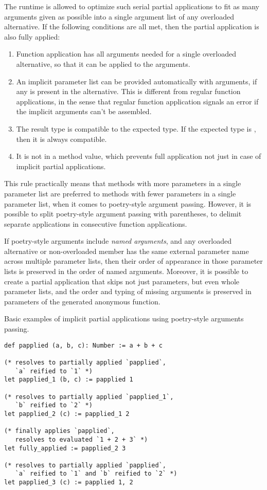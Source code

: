 The runtime is allowed to optimize such serial partial applications to fit as many arguments given as possible into a single argument list of any overloaded alternative. If the following conditions are all met, then the partial application is also fully applied:
\begin{enumerate}
  \item Function application has all arguments needed for a single overloaded alternative, so that it can be applied to the arguments. 
  \item An implicit parameter list can be provided automatically with arguments, if any is present in the alternative. This is different from regular function applications, in the sense that regular function application signals an error if the implicit arguments can't be assembled. 
  \item The result type is compatible to the expected type. If the expected type is , then it is always compatible. 
  \item It is not in a method value, which prevents full application not just in case of implicit partial applications.
\end{enumerate}

This rule practically means that methods with more parameters in a single parameter list are preferred to methods with fewer parameters in a single parameter list, when it comes to poetry-style argument passing. However, it is possible to split poetry-style argument passing with parentheses, to delimit separate applications in consecutive function applications. 

If poetry-style arguments include {\em named arguments}, and any overloaded alternative or non-overloaded member has the same external parameter name across multiple parameter lists, then their order of appearance in those parameter lists is preserved in the order of named arguments. Moreover, it is possible to create a partial application that skips not just parameters, but even whole parameter lists, and the order and typing of missing arguments is preserved in parameters of the generated anonymous function. 


\example Basic examples of implicit partial applications using poetry-style arguments passing. 
\begin{lstlisting}
def papplied (a, b, c): Number := a + b + c

(* resolves to partially applied `papplied`, 
   `a` reified to `1` *)
let papplied_1 (b, c) := papplied 1

(* resolves to partially applied `papplied_1`, 
   `b` reified to `2` *)
let papplied_2 (c) := papplied_1 2

(* finally applies `papplied`, 
   resolves to evaluated `1 + 2 + 3` *)
let fully_applied := papplied_2 3

(* resolves to partially applied `papplied`, 
   `a` reified to `1` and `b` reified to `2` *)
let papplied_3 (c) := papplied 1, 2
\end{lstlisting}

